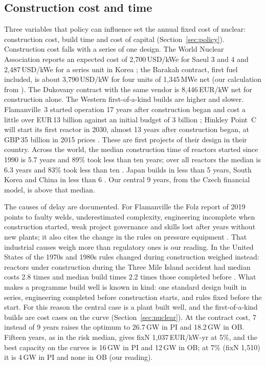 \subsection{Construction cost and time}\label{sec:construction}
Three variables that policy can influence set the annual fixed cost of nuclear: construction cost, build time and cost of capital (Section~\ref{sec:policy}). Construction cost falls with a series of one design. The World Nuclear Association reports an expected cost of 2{,}700\,USD/kWe for Saeul 3 and 4 and 2{,}487\,USD/kWe for a series unit in Korea \citep{WNAKorea,WNAEconomics}; the Barakah contract, first fuel included, is about 3{,}790\,USD/kW for four units of 1{,}345\,MWe net (our calculation from \citealp{WNAuae}). The Dukovany contract with the same vendor is 8{,}446\,EUR/kW net for construction alone. The Western first-of-a-kind builds are higher and slower. Flamanville~3 started operation 17 years after construction began and cost a little over EUR\,13 billion against an initial budget of 3 billion \citep{IlPostFlamanville}; Hinkley Point~C will start its first reactor in 2030, almost 13 years after construction began, at GBP\,35 billion in 2015 prices \citep{GuardianHPC2026}. These are first projects of their design in their country. Across the world, the median construction time of reactors started since 1990 is 5.7 years and 89\% took less than ten years; over all reactors the median is 6.3 years and 83\% took less than ten \citep{Ritchie2023}. Japan builds in less than 5 years, South Korea and China in less than 6 \citep{Ritchie2023}. Our central 9 years, from the Czech financial model, is above that median.

The causes of delay are documented. For Flamanville the Folz report of 2019 points to faulty welds, underestimated complexity, engineering incomplete when construction started, weak project governance and skills lost after years without new plants; it also cites the change in the rules on pressure equipment \citep{Folz2019}. That industrial causes weigh more than regulatory ones is our reading. In the United States of the 1970s and 1980s rules changed during construction weighed instead: reactors under construction during the Three Mile Island accident had median costs 2.8 times and median build times 2.2 times those completed before \citep{Pielke2026}. What makes a programme build well is known in kind: one standard design built in series, engineering completed before construction starts, and rules fixed before the start. For this reason the central case is a plant built well, and the first-of-a-kind builds are cost cases on the curve (Section~\ref{sec:nuclear}). At the contract cost, 7 instead of 9 years raises the optimum to 26.7\,GW in PI and 18.2\,GW in OB. Fifteen years, as in the risk median, gives fixN 1{,}037\,EUR/kW-yr at 5\%, and the best capacity on the curves is 16\,GW in PI and 12\,GW in OB; at 7\% (fixN 1{,}510) it is 4\,GW in PI and none in OB (our reading).

